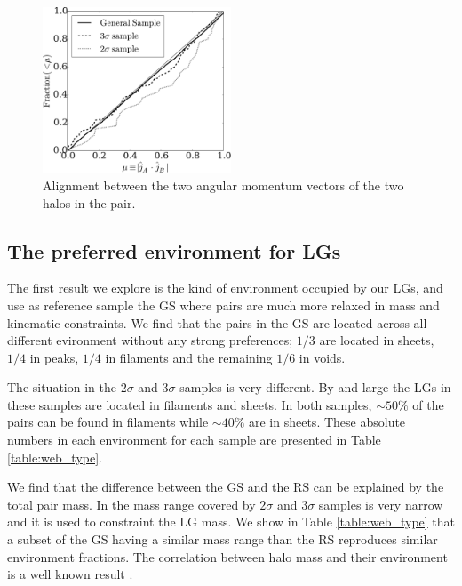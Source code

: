 \documentclass{emulateapj}
\begin{document}
\begin{figure}
\begin{center}
  \includegraphics[width=0.50\textwidth]{fig6.pdf}
\end{center}
\caption{Alignment between the two angular momentum vectors of the two
  halos in the pair.
    \label{fig:jj_alignment}}  
\end{figure}



\subsection{The preferred environment for LGs}

The first result we explore is the kind of environment occupied by
our LGs, and use as reference sample the GS where pairs are much more
relaxed in mass and kinematic constraints.
We find that the pairs in the GS are located across all different
evironment without any strong preferences; $1/3$  are located in
sheets, $1/4$ in peaks, $1/4$ in filaments and the remaining $1/6$ in
voids.  

The situation in the $2\sigma$ and $3\sigma$ samples is very
different. 
By and large the LGs in these samples are located in filaments and sheets. 
In both samples, $\sim 50\%$ of the pairs can be found in filaments
while $\sim 40\%$ are in sheets. 
These absolute numbers in each environment for each sample are
presented in Table \ref{table:web_type}.  

We find that the difference between the GS and the RS 
can be explained by the total pair mass.
In \citet{lganalogues} the mass range covered by $2\sigma$ and $3\sigma$ 
samples is very narrow and it is used to constraint the LG mass.
We show in Table \ref{table:web_type} that a subset of the GS
having a similar mass range than the RS reproduces similar environment
fractions. The correlation between halo mass and their environment is a
well known result \citep{1998ApJ...500...14L}.
\end{document}
